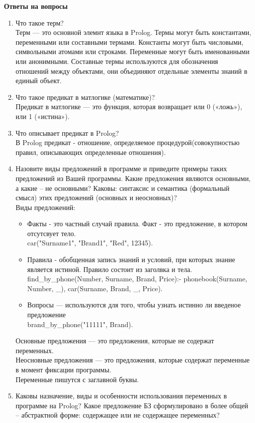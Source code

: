 \documentclass[12pt, a4paper]{extarticle}
\begin{document}
\newpage
\textbf{Ответы на вопросы}\par
\begin{enumerate}
	\item Что такое терм?\\
	Терм — это основной элемнт языка в Prolog. Термы могут быть константами, переменными или составными термами. Константы могут быть числовыми, символьными атомами или строками. Переменные могут быть именованными или анонимными. Составные термы используются для обозначения отношений между объектами, они объединяют отдельные элементы знаний в единый объект.
	\item Что такое предикат в матлогике (математике)?\\
	Предикат в матлогике — это функция, которая возвращает или  0 («ложь»), или 1 («истина»).
	\item Что описывает предикат в Prolog?\\
	В Prolog предикат - отношение, определяемое процедурой(совокупностью правил, описывающих определенные отношения). 
	\item Назовите виды предложений в программе и приведите примеры таких предложений из Вашей программы. Какие предложения являются основными, а какие – не основными? Каковы: синтаксис и семантика (формальный смысл) этих предложений (основных и неосновных)?\\
	Виды предложений:
	\begin{itemize}
		\item Факты - это частный случай правила. Факт - это предложение, в котором отсутсвует тело.\\
		car("Surname1", "Brand1", "Red", 12345).
		\item Правила - обобщенная запись знаний и условий, при которых знание является истиной. Правило состоит из заголвка и тела.\\
		find\_by\_phone(Number, Surname, Brand, Price):- phonebook(Surname, Number, \_), car(Surname, Brand, \_, Price).
		\item Вопросы — используются для того, чтобы узнать истинно ли введеное предложение\\
		brand\_by\_phone("11111", Brand).
	\end{itemize}
	Основные предложения — это предложения, которые не содержат переменных.\\ Неосновные предложения — это предложения, которые содержат переменные в момент фиксации программы. \\
	Переменные пишутся с  заглавной буквы. 
	\item Каковы назначение, виды и особенности использования переменных в программе на Prolog? Какое предложение БЗ сформулировано в более общей – абстрактной форме: содержащее или не содержащее переменных?\\

\end{enumerate}
\end{document}
